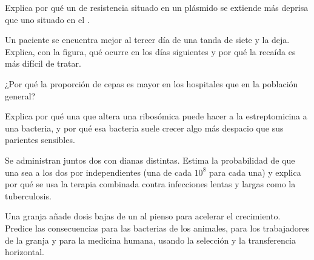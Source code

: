 \begin{exercise}[$\star\star$]\label{exo:g11:antibiotic-resistance:8}
Explica por qué un  de resistencia situado en un plásmido se
extiende más deprisa que uno situado en el .
\end{exercise}

\begin{exercise}[$\star\star$]\label{exo:g11:antibiotic-resistance:9}
Un paciente se encuentra mejor al tercer día de una tanda de siete y la
deja. Explica, con la figura, qué ocurre en los días siguientes y por
qué la recaída es más difícil de tratar.
\end{exercise}

\begin{exercise}[$\star\star$]\label{exo:g11:antibiotic-resistance:10}
¿Por qué la proporción de cepas  es mayor en los hospitales
que en la población general?
\end{exercise}

\begin{exercise}[$\star\star$]\label{exo:g11:antibiotic-resistance:11}
Explica por qué una  que altera una  ribosómica puede
hacer  a la estreptomicina a una bacteria, y por qué esa
bacteria suele crecer algo más despacio que sus parientes sensibles.
\end{exercise}

\begin{exercise}[$\star\star\star$]\label{exo:g11:antibiotic-resistance:12}
Se administran juntos dos  con dianas distintas. Estima la
probabilidad de que una  sea  a los dos por 
independientes (una de cada $10^8$ para cada una) y explica por qué se
usa la terapia combinada contra infecciones lentas y largas como la
tuberculosis.
\end{exercise}

\begin{exercise}[$\star\star\star$]\label{exo:g11:antibiotic-resistance:13}
Una granja añade dosis bajas de un  al pienso para acelerar
el crecimiento. Predice las consecuencias para las bacterias de los
animales, para los trabajadores de la granja y para la medicina humana,
usando la selección y la transferencia horizontal.
\end{exercise}

